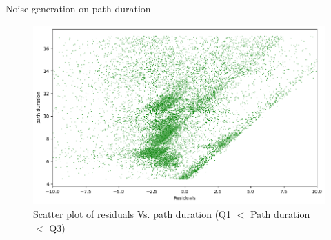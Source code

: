 \documentclass{beamer}
\begin{document}
\begin{frame}{Noise generation on path duration} 
\begin{figure}[ht]
  \centering
    \includegraphics[width=\linewidth]{Q1_Q3 residuals path duration.png}
    \caption{Scatter plot of residuals Vs. path duration (Q1 $<$ Path duration $<$ Q3)}
    \label{fig:Scatter plot of residuals Vs. path duration (Q1 < time duration < Q3)}
\end{figure}
\end{frame}
\end{document}
